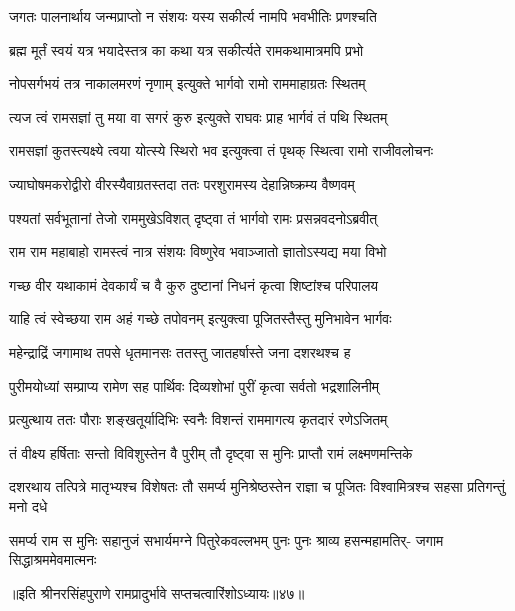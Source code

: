 \twolineshloka
{जगतः पालनार्थाय जन्मप्राप्तो न संशयः}
{यस्य सकीर्त्य नामपि भवभीतिः प्रणश्चति} %

\twolineshloka
{ब्रह्म मूर्तं स्वयं यत्र भयादेस्तत्र का कथा}
{यत्र सकीर्त्यते रामकथामात्रमपि प्रभो} %

\twolineshloka
{नोपसर्गभयं तत्र नाकालमरणं नृणाम्}
{इत्युक्ते भार्गवो रामो राममाहाग्रतः स्थितम्} %

\twolineshloka
{त्यज त्वं रामसज्ञां तु मया वा सगरं कुरु}
{इत्युक्ते राघवः प्राह भार्गवं तं पथि स्थितम्} %

\twolineshloka
{रामसज्ञां कुतस्त्यक्ष्ये त्वया योत्स्ये स्थिरो भव}
{इत्युक्त्वा तं पृथक् स्थित्वा रामो राजीवलोचनः} %

\twolineshloka
{ज्याघोषमकरोद्वीरो वीरस्यैवाग्रतस्तदा}
{ततः परशुरामस्य देहान्निष्क्रम्य वैष्णवम्} %

\twolineshloka
{पश्यतां सर्वभूतानां तेजो राममुखेऽविशत्}
{दृष्ट्वा तं भार्गवो रामः प्रसन्नवदनोऽब्रवीत्} %

\twolineshloka
{राम राम महाबाहो रामस्त्वं नात्र संशयः}
{विष्णुरेव भवाञ्जातो ज्ञातोऽस्यद्य मया विभो} %

\twolineshloka
{गच्छ वीर यथाकामं देवकार्यं च वै कुरु}
{दुष्टानां निधनं कृत्वा शिष्टांश्च परिपालय} %

\twolineshloka
{याहि त्वं स्वेच्छया राम अहं गच्छे तपोवनम्}
{इत्युक्त्वा पूजितस्तैस्तु मुनिभावेन भार्गवः} %

\twolineshloka
{महेन्द्राद्रिं जगामाथ तपसे धृतमानसः}
{ततस्तु जातहर्षास्ते जना दशरथश्च ह} %

\twolineshloka
{पुरीमयोध्यां सम्प्राप्य रामेण सह पार्थिवः}
{दिव्यशोभां पुरीं कृत्वा सर्वतो भद्रशालिनीम्} %

\twolineshloka
{प्रत्युत्थाय ततः पौराः शङ्खतूर्यादिभिः स्वनैः}
{विशन्तं राममागत्य कृतदारं रणेऽजितम्} %

\twolineshloka
{तं वीक्ष्य हर्षिताः सन्तो विविशुस्तेन वै पुरीम्}
{तौ दृष्ट्वा स मुनिः प्राप्तौ रामं लक्ष्मणमन्तिके} %

\threelineshloka
{दशरथाय तत्पित्रे मातृभ्यश्च विशेषतः}
{तौ समर्प्य मुनिश्रेष्ठस्तेन राज्ञा च पूजितः}
{विश्वामित्रश्च सहसा प्रतिगन्तुं मनो दधे} %

\fourlineindentedshloka
{समर्प्य राम स मुनिः सहानुजं}
{सभार्यमग्ने पितुरेकवल्लभम्}
{पुनः पुनः श्राव्य हसन्महामतिर्-}
{जगाम सिद्धाश्रममेवमात्मनः} %

॥इति श्रीनरसिंहपुराणे रामप्रादुर्भावे सप्तचत्वारिंशोऽध्यायः॥४७॥


